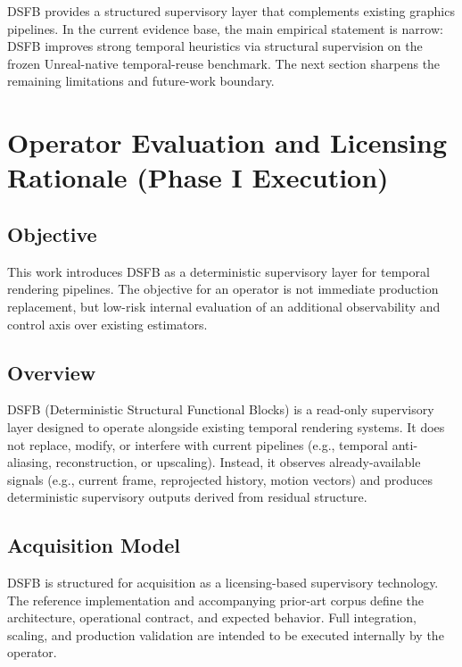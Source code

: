 \documentclass[11pt,letterpaper]{article}
\theoremstyle{gcresult}
\theoremstyle{definition}
\begin{document}
DSFB provides a structured supervisory layer that complements existing graphics pipelines. In the current evidence base, the main empirical statement is narrow: DSFB improves strong temporal heuristics via structural supervision on the frozen Unreal-native temporal-reuse benchmark. The next section sharpens the remaining limitations and future-work boundary.



\section{Operator Evaluation and Licensing Rationale (Phase I Execution)}

\subsection{Objective}
This work introduces DSFB as a deterministic supervisory layer for temporal rendering pipelines. The objective for an operator is not immediate production replacement, but low-risk internal evaluation of an additional observability and control axis over existing estimators.

\subsection{Overview}
DSFB (Deterministic Structural Functional Blocks) is a read-only supervisory layer designed to operate alongside existing temporal rendering systems. It does not replace, modify, or interfere with current pipelines (e.g., temporal anti-aliasing, reconstruction, or upscaling). Instead, it observes already-available signals (e.g., current frame, reprojected history, motion vectors) and produces deterministic supervisory outputs derived from residual structure.

\subsection{Acquisition Model}
DSFB is structured for acquisition as a licensing-based supervisory technology. The reference implementation and accompanying prior-art corpus define the architecture, operational contract, and expected behavior. Full integration, scaling, and production validation are intended to be executed internally by the operator.
\end{document}
